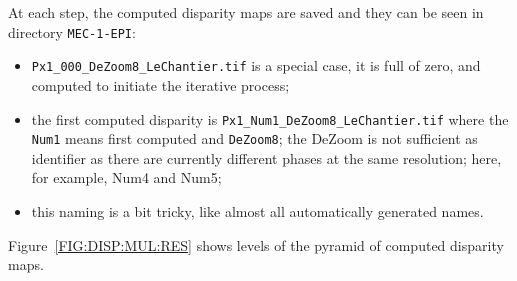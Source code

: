 At each step, the computed disparity maps are saved and they  can be seen  in
directory {\tt MEC-1-EPI}:

\begin{itemize}
   \item {\tt Px1\_000\_DeZoom8\_LeChantier.tif} is a special case, it is
        full of zero, and computed to initiate the iterative process;


   \item the first computed disparity is {\tt Px1\_Num1\_DeZoom8\_LeChantier.tif} where
          the {\tt Num1} means first computed and {\tt DeZoom8}; the DeZoom is
          not sufficient as identifier as there are currently different phases at the
           same resolution; here, for example, Num4 and Num5; 

   \item this naming is a bit tricky, like almost all automatically generated names.

\end{itemize}

Figure~\ref{FIG:DISP:MUL:RES} shows levels of the pyramid of computed disparity maps.

